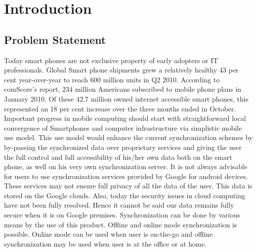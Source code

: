 \chapter{Introduction}
\section{Problem Statement}
\hspace*{0.82cm}Today smart phones are not exclusive property of early adopters or IT professionals.
Global Smart phone shipments grew a relatively healthy 43 per cent year-over-year to reach
600 million units in Q2 2010. According to comScore’s report, 234 million Americans
subscribed to mobile phone plans in January 2010. Of these 42.7 million owned internet
accessible smart phones, this represented an 18 per cent increase over the three months ended
in October.\\[0.5cm]
\hspace*{0.82cm}Important progress in mobile computing should start with straightforward local
convergence of Smartphones and computer infrastructure via simplistic mobile use model.
This use model would enhance the current synchronization schemes by by-passing the
synchronized data over proprietary services and giving the user the full control and full
accessibility of his/her own data both on the smart phone, as well on his very own
synchronization server. It is not always advisable for users to use synchronization services
provided by Google for android devices.\\[0.5cm]
\hspace*{0.82cm}These services may not ensure full privacy of all the data of the user. This data is
stored on the Google clouds. Also, today the security issues in cloud computing have not
been fully resolved. Hence it cannot be said our data remains fully secure when it is on
Google premises. Synchronization can be done by various means by the use of this product.
Offline and online mode synchronization is possible. Online mode can be used when user is
on-the-go and offline synchronization may be used when user is at the office or at home.\\[0.5cm]
